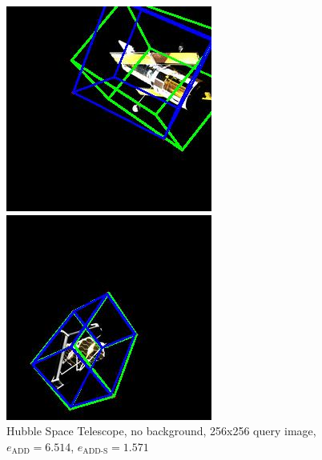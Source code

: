 \begin{figure}[h]
    \centering
    \begin{minipage}{0.45\linewidth}
        \centering
        \includegraphics[width=\linewidth]{data/fig7.jpg} %
        \caption{Hubble Space Telescope, no background, 256x256 query image, $e_\mathrm{ADD}=6.514$, $e_{\mathrm{ADD}\text{-}\mathrm{S}}=1.571$ }
        \label{fig:image1}
    \end{minipage}\hfill
    \begin{minipage}{0.45\linewidth}
        \centering
        \includegraphics[width=\linewidth]{data/fig8.jpg} %

\end{minipage}
\end{figure}

